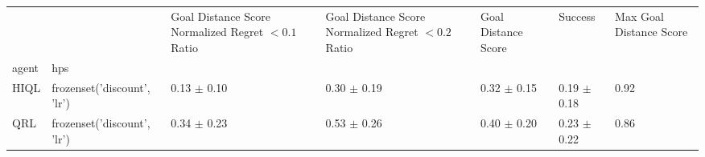 \begin{tabular}{lllllll}
\toprule
 &  & Goal Distance Score Normalized Regret $< 0.1$ Ratio & Goal Distance Score Normalized Regret $< 0.2$ Ratio & Goal Distance Score & Success & Max Goal Distance Score \\
agent & hps &  &  &  &  &  \\
\midrule
HIQL & frozenset({'discount', 'lr'}) & 0.13 $\pm$ 0.10 & 0.30 $\pm$ 0.19 & 0.32 $\pm$ 0.15 & 0.19 $\pm$ 0.18 & 0.92 \\
\cline{1-7}
QRL & frozenset({'discount', 'lr'}) & 0.34 $\pm$ 0.23 & 0.53 $\pm$ 0.26 & 0.40 $\pm$ 0.20 & 0.23 $\pm$ 0.22 & 0.86 \\
\cline{1-7}
\bottomrule
\end{tabular}
